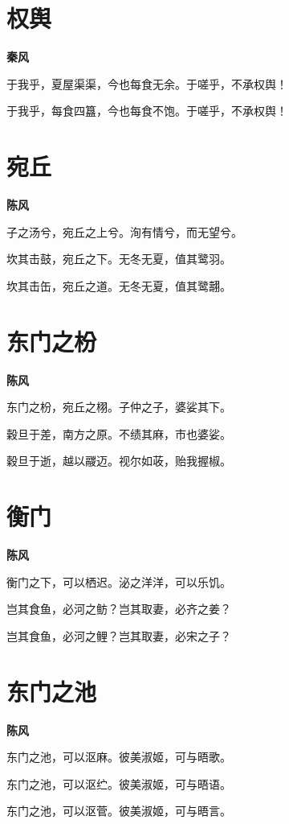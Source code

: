 \documentclass[12pt,a4paper]{ctexbook}
\begin{document}
\section{权舆}
\textbf{秦风}\par\vspace{0.5em}
于我乎，夏屋渠渠，今也每食无余。于嗟乎，不承权舆！\par
于我乎，每食四簋，今也每食不饱。于嗟乎，不承权舆！\par

\section{宛丘}
\textbf{陈风}\par\vspace{0.5em}
子之汤兮，宛丘之上兮。洵有情兮，而无望兮。\par
坎其击鼓，宛丘之下。无冬无夏，值其鹭羽。\par
坎其击缶，宛丘之道。无冬无夏，值其鹭翿。\par

\section{东门之枌}
\textbf{陈风}\par\vspace{0.5em}
东门之枌，宛丘之栩。子仲之子，婆娑其下。\par
穀旦于差，南方之原。不绩其麻，市也婆娑。\par
穀旦于逝，越以鬷迈。视尔如荍，贻我握椒。\par

\section{衡门}
\textbf{陈风}\par\vspace{0.5em}
衡门之下，可以栖迟。泌之洋洋，可以乐饥。\par
岂其食鱼，必河之鲂？岂其取妻，必齐之姜？\par
岂其食鱼，必河之鲤？岂其取妻，必宋之子？\par

\section{东门之池}
\textbf{陈风}\par\vspace{0.5em}
东门之池，可以沤麻。彼美淑姬，可与晤歌。\par
东门之池，可以沤纻。彼美淑姬，可与晤语。\par
东门之池，可以沤菅。彼美淑姬，可与晤言。\par
\end{document}
